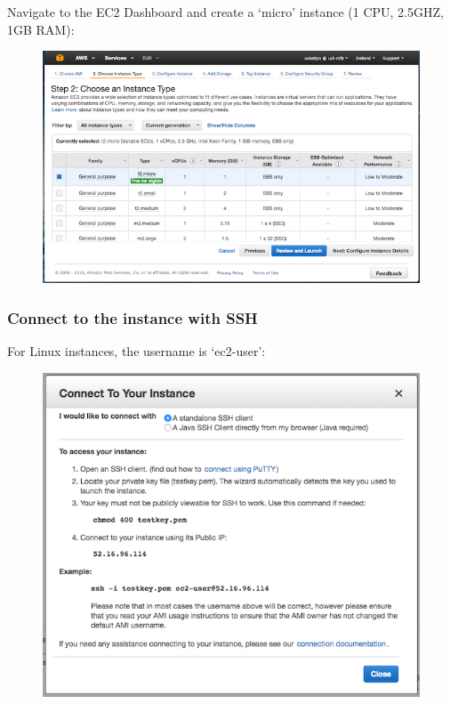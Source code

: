 Navigate to the EC2 Dashboard and create a `micro' instance (1 CPU,
2.5GHZ, 1GB RAM):

\begin{figure}[htbp]
\centering
\includegraphics{10Cloud/figures/create_ec2_instance.png}
\end{figure}

\subsubsection{Connect to the instance with
SSH}\label{connect-to-the-instance-with-ssh}

For Linux instances, the username is `ec2-user':

\begin{Shaded}
\begin{Highlighting}[]
\NormalTok{$ } \KeywordTok{<}\KeywordTok{>} \KeywordTok{<}\KeywordTok{>}
\end{Highlighting}
\end{Shaded}

\begin{figure}[htbp]
\centering
\includegraphics{10Cloud/figures/connect_to_instance.png}
\end{figure}

